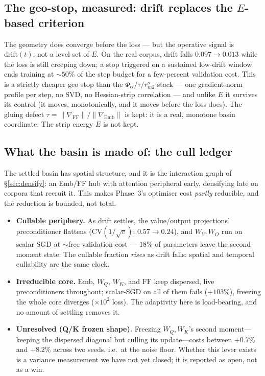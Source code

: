 \subsection{The geo-stop, measured: drift replaces the $E$-based criterion}
The geometry does converge before the loss --- but the operative signal is
$\mathrm{drift}(t)$, not a level set of $E$. On the real corpus, drift falls
$0.097 \to 0.013$ while the loss is still creeping down; a stop triggered on a
sustained low-drift window ends training at $\sim\!50\%$ of the step budget for a
few-percent validation cost. This is a strictly cheaper geo-stop than the
$\Phi_{cl}/\tau/r_{m2}^\sigma$ stack --- one gradient-norm profile per step, no
SVD, no Hessian-strip correlation --- and unlike $E$ it survives its control (it
moves, monotonically, and it moves before the loss does). The gluing defect
$\tau=\lVert\nabla_{\mathrm{FF}}\rVert/\lVert\nabla_{\mathrm{Emb}}\rVert$ is kept:
it is a real, monotone basin coordinate. The strip energy $E$ is not kept.

\subsection{What the basin is made of: the cull ledger}
The settled basin has spatial structure, and it is the interaction graph of
\S\ref{sec:densify}: an Emb/FF hub with attention peripheral early, densifying
late on corpora that recruit it. This makes Phase~3's optimiser cost
\emph{partly} reducible, and the reduction is bounded, not total.
\begin{itemize}
  \item \textbf{Cullable periphery.} As drift settles, the value/output
  projections' preconditioner flattens ($\mathrm{CV}(1/\!\sqrt{v})\!:\,0.57\to0.24$),
  and $W_V,W_O$ run on scalar SGD at $\sim$free validation cost --- $18\%$ of
  parameters leave the second-moment state. The cullable fraction \emph{rises}
  as drift falls: spatial and temporal cullability are the same clock.
  \item \textbf{Irreducible core.} $\mathrm{Emb}$, $W_Q$, $W_K$, and $\mathrm{FF}$
  keep dispersed, live preconditioners throughout; scalar-SGD on all of them
  fails ($+103\%$), freezing the whole core diverges ($\times 10^{2}$ loss). The
  adaptivity here is load-bearing, and no amount of settling removes it.
  \item \textbf{Unresolved (Q/K frozen shape).} Freezing $W_Q,W_K$'s second
  moment---keeping the dispersed diagonal but culling its update---costs between
  $+0.7\%$ and $+8.2\%$ across two seeds, i.e.\ at the noise floor. Whether this
  lever exists is a variance measurement we have not yet closed; it is reported
  as open, not as a win.
\end{itemize}

